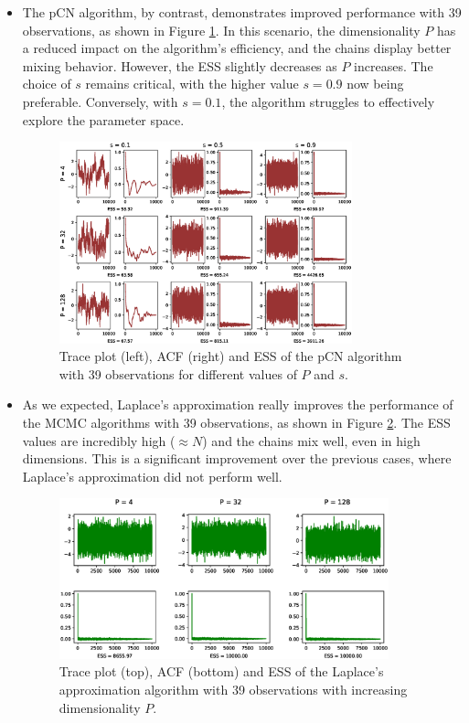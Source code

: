\documentclass{article}
\begin{document}
\begin{itemize}
\item{
    The pCN algorithm, by contrast, demonstrates improved performance with 39 observations, as shown 
    in Figure \ref{fig:pCN2}. In this scenario, the dimensionality \(P\) has a reduced impact on the 
    algorithm's efficiency, and the chains display better mixing behavior. However, the ESS slightly 
    decreases as \(P\) increases. The choice of \(s\) remains critical, with the higher value \(s=0.9\) 
    now being preferable. Conversely, with \(s=0.1\), the algorithm struggles to effectively explore 
    the parameter space.
    \begin{figure}[H]
        \centering
        \includegraphics[width=0.8\textwidth]{plots/pCN2.eps}
        \caption{Trace plot (left), ACF (right) and ESS of the pCN algorithm with 39 observations for different values of \(P\) and \(s\).}
        \label{fig:pCN2}
    \end{figure}
}

\item{
    As we expected, Laplace's approximation really improves the performance of the MCMC algorithms with 39 observations, as shown in Figure \ref{fig:Laplace2}.
    The ESS values are incredibly high ($\approx N$) and the chains mix well, even in high dimensions. This is a significant improvement over the previous cases, 
    where Laplace's approximation did not perform well. 
    \begin{figure}[H]
        \centering
        \includegraphics[width=0.9\textwidth]{plots/Laplace2.eps}
        \caption{Trace plot (top), ACF (bottom) and ESS of the Laplace's approximation algorithm with 39 observations with increasing dimensionality \(P\).}
        \label{fig:Laplace2}
    \end{figure}
}


\end{itemize}
\end{document}
